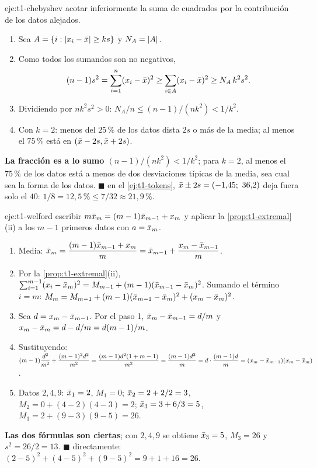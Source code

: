 \begin{solucion}{eje:t1-chebyshev}
\planteamiento acotar inferiormente la suma de cuadrados por la contribución de los datos alejados.
\pasos
\begin{enumerate}[label=\arabic*.]
  \item Sea $A=\{i:\lvert x_i-\bar{x}\rvert\ge ks\}$ y $N_A=\lvert A\rvert$.
  \item Como todos los sumandos son no negativos,
  \[
  (n-1)s^{2}=\sum_{i=1}^{n}(x_i-\bar{x})^{2}\ge\sum_{i\in A}(x_i-\bar{x})^{2}\ge N_A\,k^{2}s^{2}.
  \]
  \item Dividiendo por $nk^{2}s^{2}>0$: $N_A/n\le(n-1)/(nk^{2})<1/k^{2}$.
  \item Con $k=2$: menos del $25\,\%$ de los datos dista $2s$ o más de la media; al menos el $75\,\%$ está en $(\bar{x}-2s,\bar{x}+2s)$.
\end{enumerate}
\resultado \textbf{La fracción es a lo sumo $(n-1)/(nk^{2})<1/k^{2}$}; para $k=2$, al menos el $75\,\%$ de los datos está a menos de dos desviaciones típicas de la media, sea cual sea la forma de los datos. $\blacksquare$
\comprobacion en el \cref{ej:t1-tokens}, $\bar{x}\pm2s=(-1{,}45;\allowbreak\ 36{,}2)$ deja fuera solo el $40$: $1/8=12{,}5\,\%\le7/32\approx21{,}9\,\%$.
\end{solucion}

\begin{solucion}{eje:t1-welford}
\planteamiento escribir $m\bar{x}_m=(m-1)\bar{x}_{m-1}+x_m$ y aplicar la \cref{prop:t1-extremal}(ii) a los $m-1$ primeros datos con $a=\bar{x}_m$.
\pasos
\begin{enumerate}[label=\arabic*.]
  \item Media: $\bar{x}_m=\dfrac{(m-1)\bar{x}_{m-1}+x_m}{m}=\bar{x}_{m-1}+\dfrac{x_m-\bar{x}_{m-1}}{m}$.
  \item Por la \cref{prop:t1-extremal}(ii), $\sum_{i=1}^{m-1}(x_i-\bar{x}_m)^{2}=M_{m-1}+(m-1)(\bar{x}_{m-1}-\bar{x}_m)^{2}$. Sumando el término $i=m$: $M_m=M_{m-1}+(m-1)(\bar{x}_{m-1}-\bar{x}_m)^{2}+(x_m-\bar{x}_m)^{2}$.
  \item Sea $d=x_m-\bar{x}_{m-1}$. Por el paso 1, $\bar{x}_m-\bar{x}_{m-1}=d/m$ y $x_m-\bar{x}_m=d-d/m=d(m-1)/m$.
  \item Sustituyendo: $(m-1)\dfrac{d^{2}}{m^{2}}+\dfrac{(m-1)^{2}d^{2}}{m^{2}}=\dfrac{(m-1)d^{2}(1+m-1)}{m^{2}}=\dfrac{(m-1)d^{2}}{m}=d\cdot\dfrac{(m-1)d}{m}=(x_m-\bar{x}_{m-1})(x_m-\bar{x}_m)$.
  \item Datos $2,4,9$: $\bar{x}_1=2$, $M_1=0$; $\bar{x}_2=2+2/2=3$, $M_2=0+(4-2)(4-3)=2$; $\bar{x}_3=3+6/3=5$, $M_3=2+(9-3)(9-5)=26$.
\end{enumerate}
\resultado \textbf{Las dos fórmulas son ciertas}; con $2,4,9$ se obtiene $\bar{x}_3=5$, $M_3=26$ y $s^{2}=26/2=13$. $\blacksquare$
\comprobacion directamente: $(2-5)^{2}+(4-5)^{2}+(9-5)^{2}=9+1+16=26$.
\end{solucion}

